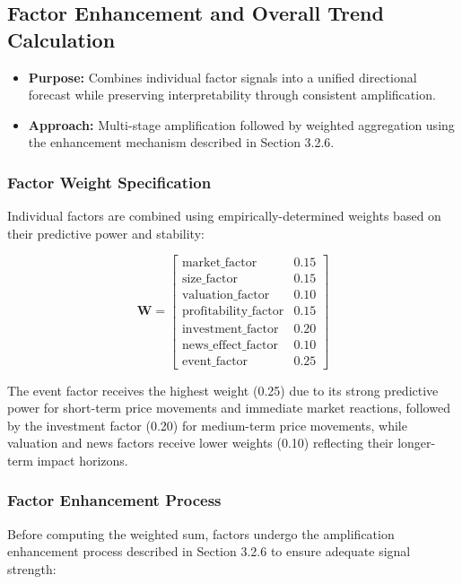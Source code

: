 \documentclass[3p,times,procedia]{elsarticle}
\begin{document}
\subsection{{Factor Enhancement and Overall Trend Calculation}}
\begin{itemize}
    \item \textbf{Purpose:} Combines individual factor signals into a unified directional forecast while preserving interpretability through consistent amplification.
    \item \textbf{Approach:} Multi-stage amplification followed by weighted aggregation using the enhancement mechanism described in Section 3.2.6.
\end{itemize}

\subsubsection{{Factor Weight Specification}}
Individual factors are combined using empirically-determined weights based on their predictive power and stability:

\begin{equation}
\textbf{W} = 
\begin{bmatrix} 
\text{market\_factor} & 0.15 \\ 
\text{size\_factor} & 0.15 \\ 
\text{valuation\_factor} & 0.10 \\ 
\text{profitability\_factor} & 0.15 \\ 
\text{investment\_factor} & 0.20 \\ 
\text{news\_effect\_factor} & 0.10 \\ 
\text{event\_factor} & 0.25
\end{bmatrix}
\end{equation}

The event factor receives the highest weight (0.25) due to its strong predictive power for short-term price movements and immediate market reactions, followed by the investment factor (0.20) for medium-term price movements, while valuation and news factors receive lower weights (0.10) reflecting their longer-term impact horizons.

\subsubsection{{Factor Enhancement Process}}
Before computing the weighted sum, factors undergo the amplification enhancement process described in Section 3.2.6 to ensure adequate signal strength:
\end{document}
